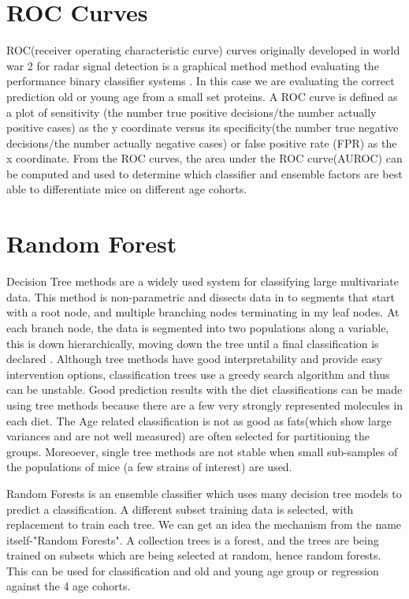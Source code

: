 \documentclass[a4paper,11pt,twoside]{book}
\begin{document}
	\section{ROC Curves}
	
	ROC(receiver operating characteristic curve) curves originally developed in world war 2 for radar signal detection is a graphical method method evaluating the performance binary classifier systems \citep{HajianTilaki2013}. In this case we are evaluating the correct prediction old or young age from a small set proteins. A ROC curve is defined as a plot of sensitivity (the number true positive decisions/the number actually positive cases) as the y coordinate versus its specificity(the number true negative decisions/the number actually negative cases) or false positive rate (FPR) as the x coordinate. From the ROC curves, the area under the ROC curve(AUROC) can be computed and used to determine which classifier and ensemble factors are best able to differentiate mice on different age cohorts.
	
	\section{Random Forest}
	
	Decision Tree methods are a widely used system for classifying large multivariate data. This method is non-parametric and dissects data in to segments that start with a root node, and multiple branching nodes terminating in my leaf nodes. At each branch node, the data is segmented into two populations along a variable, this is down hierarchically, moving down the tree until a final classification is declared \citep{Song2015DecisionTrees}. Although tree methods have good interpretability and provide easy intervention options, classification trees use a greedy search algorithm and thus can be unstable\citep{Song2015DecisionTrees}. Good prediction results with the diet classifications can be made using tree methods because there are a few very strongly represented molecules in each diet. The Age related classification is not as good as fats(which show large variances and are not well measured) are often selected for partitioning the groups. Moreoever, single tree methods are not stable when small sub-samples of the populations of mice (a few strains of interest) are used.
	
	Random Forests is an ensemble classifier which uses many decision tree models to predict a classification. A different subset training data is selected, with replacement to train each tree\citep{Goel2017RandomForest}. We can get an idea the mechanism from the name itself-"Random Forests". A collection trees is a forest, and the trees are being trained on subsets which are being selected at random, hence random forests\citep{Goel2017RandomForest}. This can be used for classification and old and young age group or regression against the 4 age cohorts.
	
\end{document}

